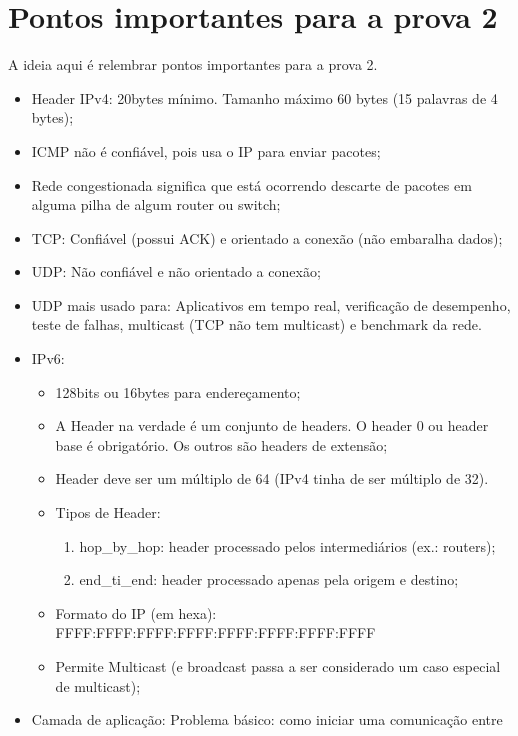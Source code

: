 \documentclass{article}
\begin{document}
\section{Pontos importantes para a prova 2}

A ideia aqui é relembrar pontos importantes para a prova 2.

\begin{itemize}
   \item Header IPv4: 20bytes mínimo. Tamanho máximo 60 bytes (15 palavras de 4 bytes);
   \item ICMP não é confiável, pois usa o IP para enviar pacotes;
   \item Rede congestionada significa que está ocorrendo descarte de pacotes em alguma pilha de
algum router ou switch;
   \item TCP: Confiável (possui ACK) e orientado a conexão (não embaralha dados);
   \item UDP: Não confiável e não orientado a conexão;
   \item UDP mais usado para: Aplicativos em tempo real, verificação de desempenho, teste de falhas,
multicast (TCP não tem multicast) e benchmark da rede.
   \item IPv6:
      \begin{itemize}
         \item 128bits ou 16bytes para endereçamento;
         \item A Header na verdade é um conjunto de headers. O header 0 ou header base é
obrigatório. Os outros são headers de extensão;
         \item Header deve ser um múltiplo de 64 (IPv4 tinha de ser múltiplo de 32).
         \item Tipos de Header:
            \begin{enumerate}
               \item hop\_by\_hop: header processado pelos intermediários (ex.: routers);
               \item end\_ti\_end: header processado apenas pela origem e destino;
            \end{enumerate}
         \item Formato do IP (em hexa): FFFF:FFFF:FFFF:FFFF:FFFF:FFFF:FFFF:FFFF
         \item Permite Multicast (e broadcast passa a ser considerado um caso especial de
multicast);
      \end{itemize}
   \item Camada de aplicação: Problema básico: como iniciar uma comunicação entre

\end{itemize}
\end{document}
